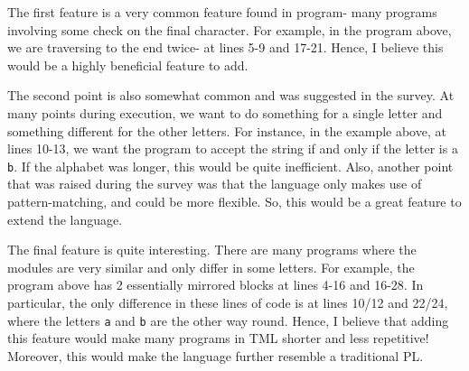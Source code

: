 The first feature is a very common feature found in program- many programs involving some check on the final character. For example, in the program above, we are traversing to the end twice- at lines 5-9 and 17-21. Hence, I believe this would be a highly beneficial feature to add.

The second point is also somewhat common and was suggested in the survey. At many points during execution, we want to do something for a single letter and something different for the other letters. For instance, in the example above, at lines 10-13, we want the program to accept the string if and only if the letter is a \texttt{b}. If the alphabet was longer, this would be quite inefficient. Also, another point that was raised during the survey was that the language only makes use of pattern-matching, and could be more flexible. So, this would be a great feature to extend the language. 

The final feature is quite interesting. There are many programs where the modules are very similar and only differ in some letters. For example, the program above has 2 essentially mirrored blocks at lines 4-16 and 16-28. In particular, the only difference in these lines of code is at lines 10/12 and 22/24, where the letters \texttt{a} and \texttt{b} are the other way round. Hence, I believe that adding this feature would make many programs in TML shorter and less repetitive! Moreover, this would make the language further resemble a traditional PL.



